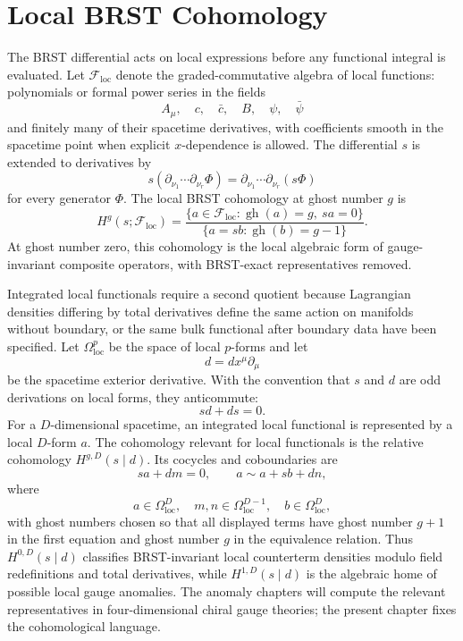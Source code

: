 \section{Local BRST Cohomology}

The BRST differential acts on local expressions before any functional integral
is evaluated.  Let \(\mathcal F_{\mathrm{loc}}\) denote the graded-commutative
algebra of local functions: polynomials or formal power series in the fields
\[
  A_\mu,\quad c,\quad \bar c,\quad B,\quad \psi,\quad \bar\psi
\]
and finitely many of their spacetime derivatives, with coefficients smooth in
the spacetime point when explicit \(x\)-dependence is allowed.  The differential
\(s\) is extended to derivatives by
\[
  s(\partial_{\nu_1}\cdots\partial_{\nu_r}\Phi)
  =
  \partial_{\nu_1}\cdots\partial_{\nu_r}(s\Phi)
\]
for every generator \(\Phi\).  The local BRST cohomology at ghost number \(g\)
is
\[
  H^g(s;\mathcal F_{\mathrm{loc}})
  =
  \frac{\{a\in\mathcal F_{\mathrm{loc}}:\operatorname{gh}(a)=g,\ sa=0\}}
       {\{a=sb:\operatorname{gh}(b)=g-1\}} .
\]
At ghost number zero, this cohomology is the local algebraic form of
gauge-invariant composite operators, with BRST-exact representatives removed.

Integrated local functionals require a second quotient because Lagrangian
densities differing by total derivatives define the same action on manifolds
without boundary, or the same bulk functional after boundary data have been
specified.  Let \(\Omega^p_{\mathrm{loc}}\) be the space of local \(p\)-forms and
let
\[
  d=dx^\mu\partial_\mu
\]
be the spacetime exterior derivative.  With the convention that \(s\) and \(d\)
are odd derivations on local forms, they anticommute:
\[
  sd+ds=0 .
\]
For a \(D\)-dimensional spacetime, an integrated local functional is represented
by a local \(D\)-form \(a\).  The cohomology relevant for local functionals is
the relative cohomology \(H^{g,D}(s\mid d)\).  Its cocycles and coboundaries are
\[
  sa+dm=0,
  \qquad
  a\sim a+sb+dn ,
\]
where
\[
  a\in\Omega^D_{\mathrm{loc}},\quad
  m,n\in\Omega^{D-1}_{\mathrm{loc}},\quad
  b\in\Omega^D_{\mathrm{loc}},
\]
with ghost numbers chosen so that all displayed terms have ghost number \(g+1\)
in the first equation and ghost number \(g\) in the equivalence relation.  Thus
\(H^{0,D}(s\mid d)\) classifies BRST-invariant local counterterm densities
modulo field redefinitions and total derivatives, while \(H^{1,D}(s\mid d)\)
is the algebraic home of possible local gauge anomalies.  The anomaly chapters
will compute the relevant representatives in four-dimensional chiral gauge
theories; the present chapter fixes the cohomological language.

